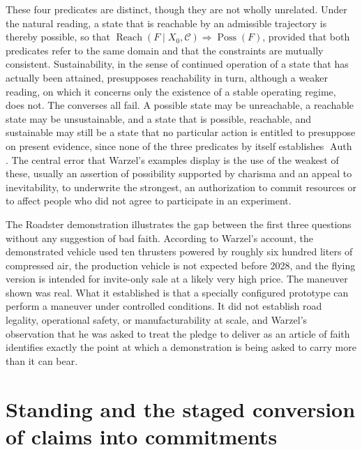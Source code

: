 \documentclass[11pt]{article}
\theoremstyle{plain}
\theoremstyle{definition}
\theoremstyle{remark}
\newcommand{\Auth}{\operatorname{Auth}}
\newcommand{\Poss}{\operatorname{Poss}}
\newcommand{\Reach}{\operatorname{Reach}}
\begin{document}
These four predicates are distinct, though they are not wholly unrelated. Under the natural reading, a state that is reachable by an admissible trajectory is thereby possible, so that $\Reach(F \mid X_0, \mathcal{C}) \Rightarrow \Poss(F)$, provided that both predicates refer to the same domain and that the constraints are mutually consistent. Sustainability, in the sense of continued operation of a state that has actually been attained, presupposes reachability in turn, although a weaker reading, on which it concerns only the existence of a stable operating regime, does not. The converses all fail. A possible state may be unreachable, a reachable state may be unsustainable, and a state that is possible, reachable, and sustainable may still be a state that no particular action is entitled to presuppose on present evidence, since none of the three predicates by itself establishes $\Auth$. The central error that Warzel's examples display is the use of the weakest of these, usually an assertion of possibility supported by charisma and an appeal to inevitability, to underwrite the strongest, an authorization to commit resources or to affect people who did not agree to participate in an experiment.

The Roadster demonstration illustrates the gap between the first three questions without any suggestion of bad faith. According to Warzel's account, the demonstrated vehicle used ten thrusters powered by roughly six hundred liters of compressed air, the production vehicle is not expected before 2028, and the flying version is intended for invite-only sale at a likely very high price. The maneuver shown was real. What it established is that a specially configured prototype can perform a maneuver under controlled conditions. It did not establish road legality, operational safety, or manufacturability at scale, and Warzel's observation that he was asked to treat the pledge to deliver as an article of faith identifies exactly the point at which a demonstration is being asked to carry more than it can bear.

\section{Standing and the staged conversion of claims into commitments}
\end{document}
